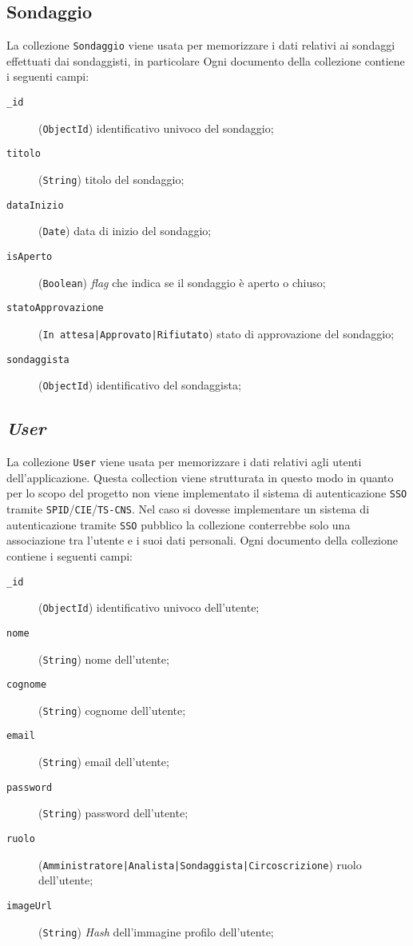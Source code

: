     \subsection{Sondaggio}
        La collezione \texttt{Sondaggio} viene usata per memorizzare i dati relativi ai sondaggi effettuati dai sondaggisti, in particolare 
        Ogni documento della collezione contiene i seguenti campi:
        \begin{description}
            \item[\texttt{\_id}] (\texttt{ObjectId}) identificativo univoco del sondaggio;
            \item[\texttt{titolo}] (\texttt{String}) titolo del sondaggio;
            \item[\texttt{dataInizio}] (\texttt{Date}) data di inizio del sondaggio;
            \item[\texttt{isAperto}] (\texttt{Boolean}) \textit{flag} che indica se il sondaggio è aperto o chiuso;
            \item[\texttt{statoApprovazione}] (\texttt{In attesa|Approvato|Rifiutato}) stato di approvazione del sondaggio;
            \item[\texttt{sondaggista}] (\texttt{ObjectId}) identificativo del sondaggista;
        \end{description}
    \subsection{\textit{User}}
        La collezione \texttt{User} viene usata per memorizzare i dati relativi agli utenti dell'applicazione. Questa collection viene strutturata in questo modo in quanto per lo scopo del progetto non viene implementato il sistema di autenticazione \texttt{SSO} tramite \texttt{SPID}/\texttt{CIE}/\texttt{TS-CNS}. Nel caso si dovesse implementare un sistema di autenticazione tramite \texttt{SSO} pubblico la collezione conterrebbe solo una associazione tra l'utente e i suoi dati personali.
        Ogni documento della collezione contiene i seguenti campi:
        \begin{description}
            \item[\texttt{\_id}] (\texttt{ObjectId}) identificativo univoco dell'utente;
            \item[\texttt{nome}] (\texttt{String}) nome dell'utente;
            \item[\texttt{cognome}] (\texttt{String}) cognome dell'utente;
            \item[\texttt{email}] (\texttt{String}) email dell'utente;
            \item[\texttt{password}] (\texttt{String}) password dell'utente;
            \item[\texttt{ruolo}] (\texttt{Amministratore|Analista|Sondaggista|Circoscrizione}) ruolo dell'utente;
            \item[\texttt{imageUrl}] (\texttt{String}) \textit{Hash} dell'immagine profilo dell'utente;
        \end{description}
